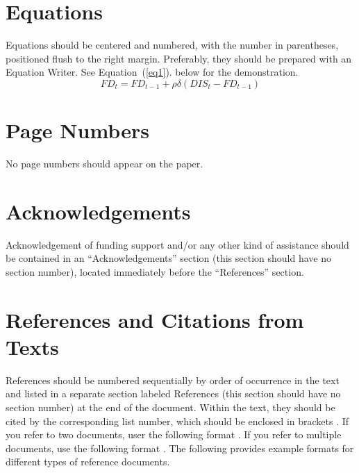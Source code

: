 \documentclass{iserc}%
\begin{document}
\section{Equations}
Equations should be centered and numbered, with the number in parentheses, positioned flush to the right margin.  Preferably, they should be prepared with an Equation Writer.  See Equation~(\ref{eq1}). below for the demonstration.
\begin{equation}
FD_t = FD_{t-1} + \rho\delta(DIS_t - FD_{t-1})
\label{eq1}
\end{equation}

\section{Page Numbers}
No page numbers should appear on the paper. 

\section{Acknowledgements}
Acknowledgement of funding support and/or any other kind of assistance should be contained in an ``Acknowledgements'' section (this section should have no section number), located immediately before the ``References'' section. 

\section{References and Citations from Texts} 
References should be numbered sequentially by order of occurrence in the text and listed in a separate section labeled References (this section should have no section number) at the end of the document.  Within the text, they should be cited by the corresponding list number, which should be enclosed in brackets \cite{son03}.  If you refer to two documents, user the following format \cite{son06,ven051}.  If you refer to multiple documents, use the following format \cite{ven052,ven053,cha06,ush99,raj00}.   The following provides example formats for different types of reference documents.
\end{document}
